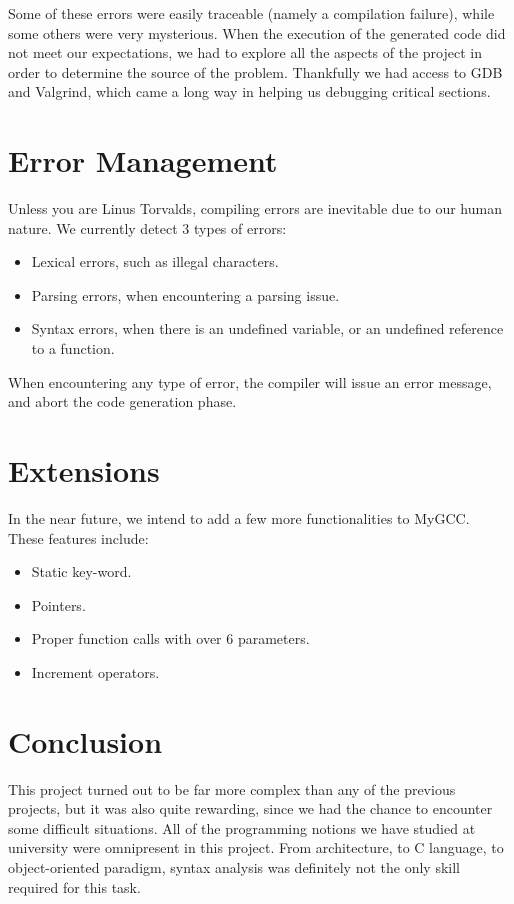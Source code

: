 \documentclass{article}
\begin{document}
Some of these errors were easily traceable (namely a compilation failure), while some others were very mysterious. When the execution of the generated code did not meet our expectations, we had to explore all the aspects of the project in order to determine the source of the problem. Thankfully we had access to GDB and Valgrind, which came a long way in helping us debugging critical sections.\\


\section{Error Management}
Unless you are Linus Torvalds, compiling errors are inevitable due to our human nature. We currently detect 3 types of errors:

\begin{itemize}
\item Lexical errors, such as illegal characters.
\item Parsing errors, when encountering a parsing issue.
\item Syntax errors, when there is an undefined variable, or an undefined reference to a function.
\end{itemize}

When encountering any type of error, the compiler will issue an error message, and abort the code generation phase.

\section{Extensions}
In the near future, we intend to add a few more functionalities to MyGCC.\\
These features include:

\begin{itemize}
\item Static key-word.
\item Pointers.
\item Proper function calls with over 6 parameters.
\item Increment operators.
\end{itemize}

\section{Conclusion}
This project turned out to be far more complex than any of the previous projects, but it was also quite rewarding, since we had the chance to encounter some difficult situations. All of the programming notions we have studied at university were omnipresent in this project. From architecture, to C language, to object-oriented paradigm, syntax analysis was definitely not the only skill required for this task.\\
\end{document}
